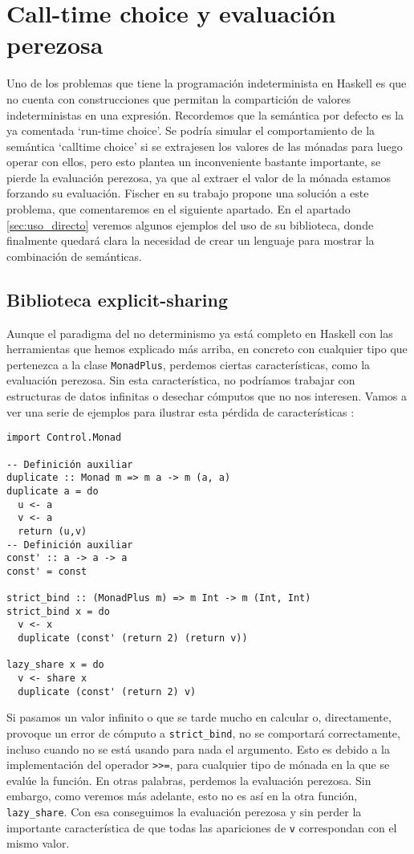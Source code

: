 \documentclass[class=article, crop=false]{standalone}
\begin{document}
\section{Call-time choice y evaluación perezosa}
Uno de los problemas que tiene la programación indeterminista en Haskell es que no cuenta con
construcciones que permitan la compartición de valores indeterministas en una expresión.
Recordemos que la semántica por defecto es la ya comentada `run-time choice'. Se podría
simular el comportamiento de la semántica `calltime choice' si se extrajesen los valores de
las mónadas para luego operar con ellos, pero esto plantea un inconveniente bastante
importante, se pierde la evaluación perezosa, ya que al extraer el valor de la mónada estamos
forzando su evaluación. Fischer en su trabajo \cite{fischer2011purely} propone una solución a
este problema, que comentaremos en el siguiente apartado. En el apartado
\ref{sec:uso_directo} veremos algunos ejemplos del uso de su biblioteca, donde finalmente
quedará clara la necesidad de crear un lenguaje para mostrar la combinación de semánticas.

\subsection{Biblioteca explicit-sharing}\label{sec:explicit_sharing}
Aunque el paradigma del no determinismo ya está completo en Haskell con las herramientas que
hemos explicado más arriba, en concreto con cualquier tipo que pertenezca a la clase
\verb`MonadPlus`, perdemos ciertas características, como la evaluación perezosa. Sin esta
característica, no podríamos trabajar con estructuras de datos infinitas o desechar cómputos
que no nos interesen. Vamos a ver una serie de ejemplos para ilustrar esta pérdida de
características \cite{fischer2011purely}:

\begin{verbatim}
import Control.Monad

-- Definición auxiliar
duplicate :: Monad m => m a -> m (a, a)
duplicate a = do
  u <- a
  v <- a
  return (u,v)
-- Definición auxiliar
const' :: a -> a -> a
const' = const

strict_bind :: (MonadPlus m) => m Int -> m (Int, Int)
strict_bind x = do
  v <- x
  duplicate (const' (return 2) (return v))

lazy_share x = do
  v <- share x
  duplicate (const' (return 2) v)
\end{verbatim}

Si pasamos un valor infinito o que se tarde mucho en calcular o, directamente, provoque un
error de cómputo a \verb`strict_bind`, no se comportará correctamente, incluso cuando no se
está usando para nada el argumento. Esto es debido a la implementación del operador
\verb`>>=`, para cualquier tipo de mónada en la que se evalúe la función. En otras palabras,
perdemos la evaluación perezosa. Sin embargo, como veremos más adelante, esto no es así en
la otra función, \verb`lazy_share`. Con esa conseguimos la evaluación perezosa y sin perder
la importante característica de que todas las apariciones de \verb`v` correspondan con el
mismo valor.
\end{document}
